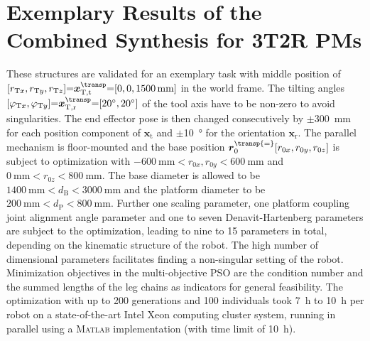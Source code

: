 \documentclass[
	graybox,
	vecphys] %
	{svmult}
\newcommand{\bm}[1]{\boldsymbol{#1}}
\begin{document}
\section{Exemplary Results of the Combined Synthesis for 3T2R PMs}
\label{sec:results}

These structures are validated for an exemplary task with middle position of $[r_{\mathrm{T}x},r_{\mathrm{T}y},r_{\mathrm{T}z}]{=}\bm{x}^\transp_\mathrm{T,t}{=}[0,0,\SI{1500}{\milli\metre}]$ in the world frame.
%
%
The tilting angles $[\varphi_{\mathrm{T}x},\varphi_{\mathrm{T}y}]{=}\\\bm{x}^\transp_\mathrm{T,r}{=}[\SI{20}{\degree},\SI{20}{\degree}]$ of the tool axis have to be non-zero to avoid singularities.
The end effector pose is then changed consecutively by $\pm$\SI{300}{\milli\metre} for each position component of $\bm{x}_\mathrm{t}$ and $\pm$\SI{10}{\degree} for the orientation $\bm{x}_\mathrm{r}$. %
The parallel mechanism is floor-mounted and the base position $\bm{r}_0^\transp{=}[r_{0x},r_{0y},r_{0z}]$ is subject to optimization with  $\SI{-600}{\milli\metre}{<}r_{0x},r_{0y}{<}\SI{600}{\milli\metre}$ and $\SI{0}{\milli\metre}{<}r_{0z}{<}\SI{800}{\milli\metre}$.
The base diameter is allowed to be  $\SI{1400}{\milli\metre}{<}d_\mathrm{B}{<}\SI{3000}{\milli\metre}$ and the platform diameter to be $\SI{200}{\milli\metre}{<}d_\mathrm{P}{<}\SI{800}{\milli\metre}$.
Further one scaling parameter, one platform coupling joint alignment angle parameter and one to seven Denavit-Hartenberg parameters \cite{BriotKha2015} are subject to the optimization, leading to nine to 15 parameters in total, depending on the kinematic structure of the robot. 
The high number of dimensional parameters facilitates finding a non-singular setting of the robot. %
%
Minimization objectives in the multi-objective PSO are the condition number and the summed lengths of the leg chains as indicators for general feasibility.
The optimization with up to 200 generations and 100 individuals took \SI{7}{\hour} to \SI{10}{\hour} per robot on a state-of-the-art Intel Xeon computing cluster system, running in parallel using a \textsc{Matlab} implementation (with time limit of \SI{10}{\hour}).
\end{document}
